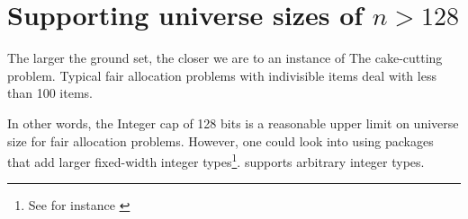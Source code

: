 \section{Supporting universe sizes of \texorpdfstring{$n > 128$}{n > 128}}
The larger the ground set, the closer we are to an instance of The cake-cutting problem. Typical fair allocation problems with indivisible items deal with less than 100 items. 

In other words, the Integer cap of 128 bits is a reasonable upper limit on universe size for fair allocation problems. However, one could look into using packages that add larger fixed-width integer types\footnote{See for instance \href{https://github.com/rfourquet/BitIntegers.jl}{}}.  supports arbitrary integer types. 